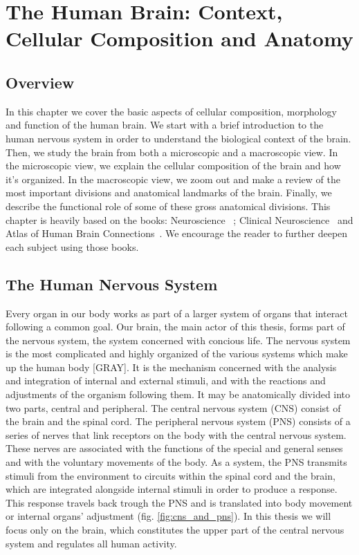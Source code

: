 
\chapter{The Human Brain: Context, Cellular Composition and Anatomy}

\section{Overview}
In this chapter we cover the basic aspects of cellular composition, morphology
and function of the human brain. We start with a brief introduction to the
human nervous system in order to understand the biological context of the brain.
Then, we study the brain from both a microscopic and a macroscopic view. In the
microscopic view, we explain the cellular composition of the brain and how it’s
organized. In the macroscopic view, we zoom out and make a review of the most 
important divisions and anatomical landmarks of the brain. Finally, we describe
the functional role of some of these gross anatomical divisions. This chapter is
heavily based on the books: Neuroscience~\cite{Purves2004} ; Clinical
Neuroscience~\cite{Johns} and Atlas of Human Brain Connections~\cite{Catani2012}.
We encourage the reader to further deepen each subject using those books.

\section{The Human Nervous System}
Every organ in our body works as part of a larger system of organs that
interact following a common goal. Our brain, the main actor of this thesis,
forms part of the nervous system, the system concerned with concious life.
The nervous system is the most complicated and highly organized of the various
systems which make up the human body [GRAY]. It is the mechanism concerned with
the analysis and integration of internal and external stimuli, and with the 
reactions and adjustments of the organism following them. It may be anatomically
divided into two parts, central and peripheral. The central nervous system (CNS)
consist of the brain and the spinal cord. The peripheral nervous system (PNS) 
consists of a series of nerves that link receptors on the body with the central
nervous system. These nerves are associated with the functions of the special 
and general senses and with the voluntary movements of the body. As a system, 
the PNS transmits stimuli from the environment to circuits within the spinal 
cord and the brain, which are integrated alongside internal stimuli in order to
produce a response. This response travels back trough the PNS and is translated
into body movement or internal organs' adjustment (fig. \ref{fig:cns_and_pns}).
In this thesis we will focus only on the brain, which constitutes the upper part
of the central nervous system and regulates all human activity.

